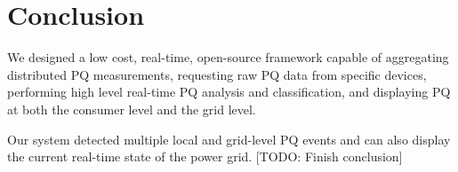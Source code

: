 \documentclass[conference]{IEEEtran}
\begin{document}
%






\section{Conclusion}
We designed a low cost, real-time, open-source framework capable of aggregating distributed PQ measurements, requesting raw PQ data from specific devices, performing high level real-time PQ analysis and classification, and displaying PQ at both the consumer level and the grid level. 

Our system detected multiple local and grid-level PQ events and can also display the current real-time state of the power grid. [TODO: Finish conclusion]
\end{document}

